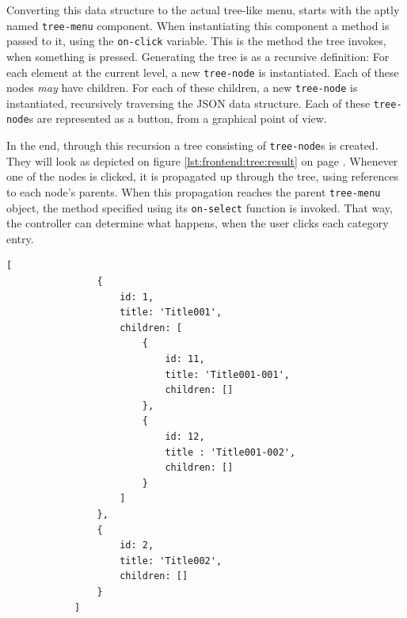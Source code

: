		Converting this data structure to the actual tree-like menu, starts with the aptly named \verb=tree-menu= component. When instantiating this component a method is passed to it, using the \verb=on-click= variable. This is the method the tree invokes, when something is pressed. Generating the tree is as a recursive definition: For each element at the current level, a new \verb=tree-node= is instantiated. Each of these nodes \emph{may} have children. For each of these children, a new \verb=tree-node= is instantiated, recursively traversing the JSON data structure.	Each of these \verb=tree-node=s are represented as a button, from a graphical point of view.

		In the end, through this recursion a tree consisting of \verb=tree-node=s is created. They will look as depicted on figure \ref{lst:frontend:tree:result} on page \pageref{lst:frontend:tree:result}. Whenever one of the nodes is clicked, it is propagated up through the tree, using references to each node's parents. When this propagation reaches the parent \verb=tree-menu= object, the method specified using its \verb=on-select= function is invoked. That way, the controller can determine what happens, when the user clicks each category entry.

		\pagebreak

		\begin{lstlisting}[style=json2,gobble=12, caption={The front-end's category tree data structure},label={lst:frontend:tree:data}]
            [
                {
                    id: 1,
                    title: 'Title001',
                    children: [
                        {
                            id: 11,
                            title: 'Title001-001',
                            children: []
                        },
                        {
                            id: 12,
                            title : 'Title001-002',
                            children: []
                        }
                    ]
                },
                {
                    id: 2,
                    title: 'Title002',
                    children: []
                }
            ]
		\end{lstlisting}
	
